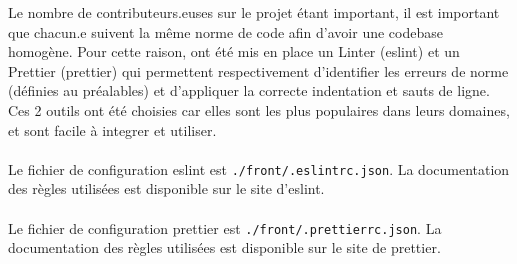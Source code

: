 Le nombre de contributeurs.euses sur le projet étant important, il est important que chacun.e suivent la même norme de code afin d’avoir une codebase homogène.
Pour cette raison, ont été mis en place un Linter (eslint) et un Prettier (prettier) qui permettent respectivement d'identifier les erreurs de norme (définies au préalables) et d’appliquer la correcte indentation et sauts de ligne.
Ces 2 outils ont été choisies car elles sont les plus populaires dans leurs domaines, et sont facile à integrer et utiliser.
\\\\
Le fichier de configuration eslint est \verb|./front/.eslintrc.json|. La documentation des règles utilisées est disponible sur le site d’eslint.
\\\\
Le fichier de configuration prettier est \verb|./front/.prettierrc.json|. La documentation des règles utilisées est disponible sur le site de prettier.
